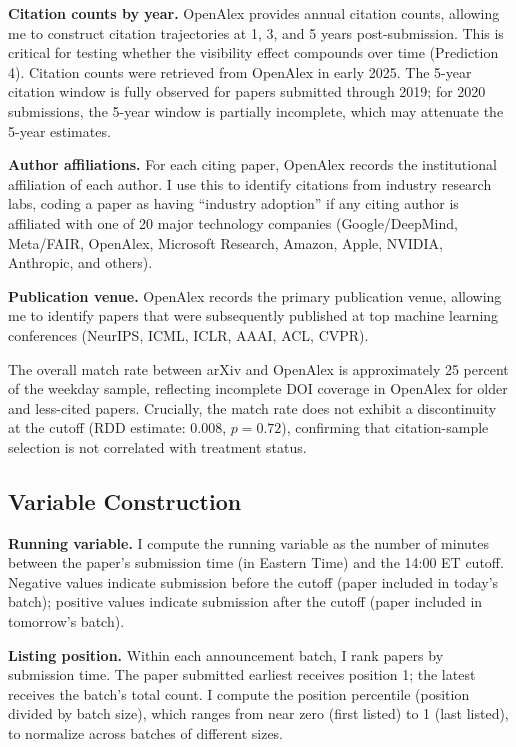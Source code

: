 \documentclass[12pt]{article}
\begin{document}
\textbf{Citation counts by year.} OpenAlex provides annual citation counts, allowing me to construct citation trajectories at 1, 3, and 5 years post-submission. This is critical for testing whether the visibility effect compounds over time (Prediction 4). Citation counts were retrieved from OpenAlex in early 2025. The 5-year citation window is fully observed for papers submitted through 2019; for 2020 submissions, the 5-year window is partially incomplete, which may attenuate the 5-year estimates.

\textbf{Author affiliations.} For each citing paper, OpenAlex records the institutional affiliation of each author. I use this to identify citations from industry research labs, coding a paper as having ``industry adoption'' if any citing author is affiliated with one of 20 major technology companies (Google/DeepMind, Meta/FAIR, OpenAlex, Microsoft Research, Amazon, Apple, NVIDIA, Anthropic, and others).

\textbf{Publication venue.} OpenAlex records the primary publication venue, allowing me to identify papers that were subsequently published at top machine learning conferences (NeurIPS, ICML, ICLR, AAAI, ACL, CVPR).

The overall match rate between arXiv and OpenAlex is approximately 25 percent of the weekday sample, reflecting incomplete DOI coverage in OpenAlex for older and less-cited papers. Crucially, the match rate does not exhibit a discontinuity at the cutoff (RDD estimate: 0.008, $p = 0.72$), confirming that citation-sample selection is not correlated with treatment status.

\subsection{Variable Construction}

\textbf{Running variable.} I compute the running variable as the number of minutes between the paper's submission time (in Eastern Time) and the 14:00 ET cutoff. Negative values indicate submission before the cutoff (paper included in today's batch); positive values indicate submission after the cutoff (paper included in tomorrow's batch).

\textbf{Listing position.} Within each announcement batch, I rank papers by submission time. The paper submitted earliest receives position 1; the latest receives the batch's total count. I compute the position percentile (position divided by batch size), which ranges from near zero (first listed) to 1 (last listed), to normalize across batches of different sizes.
\end{document}
